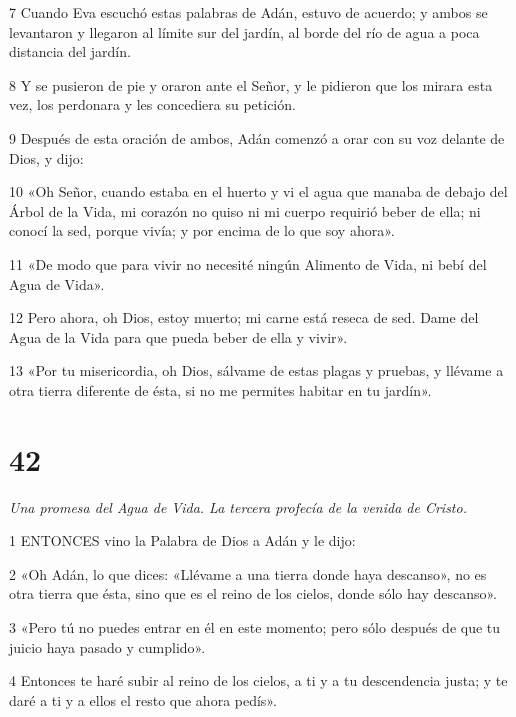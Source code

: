 \par 7 Cuando Eva escuchó estas palabras de Adán, estuvo de acuerdo; y ambos se levantaron y llegaron al límite sur del jardín, al borde del río de agua a poca distancia del jardín.

\par 8 Y se pusieron de pie y oraron ante el Señor, y le pidieron que los mirara esta vez, los perdonara y les concediera su petición.

\par 9 Después de esta oración de ambos, Adán comenzó a orar con su voz delante de Dios, y dijo:

\par 10 «Oh Señor, cuando estaba en el huerto y vi el agua que manaba de debajo del Árbol de la Vida, mi corazón no quiso ni mi cuerpo requirió beber de ella; ni conocí la sed, porque vivía; y por encima de lo que soy ahora».

\par 11 «De modo que para vivir no necesité ningún Alimento de Vida, ni bebí del Agua de Vida».

\par 12 Pero ahora, oh Dios, estoy muerto; mi carne está reseca de sed. Dame del Agua de la Vida para que pueda beber de ella y vivir».

\par 13 «Por tu misericordia, oh Dios, sálvame de estas plagas y pruebas, y llévame a otra tierra diferente de ésta, si no me permites habitar en tu jardín».

\chapter{42}

\par \textit{Una promesa del Agua de Vida. La tercera profecía de la venida de Cristo.}

\par 1 ENTONCES vino la Palabra de Dios a Adán y le dijo:

\par 2 «Oh Adán, lo que dices: «Llévame a una tierra donde haya descanso», no es otra tierra que ésta, sino que es el reino de los cielos, donde sólo hay descanso».

\par 3 «Pero tú no puedes entrar en él en este momento; pero sólo después de que tu juicio haya pasado y cumplido».

\par 4 Entonces te haré subir al reino de los cielos, a ti y a tu descendencia justa; y te daré a ti y a ellos el resto que ahora pedís».

